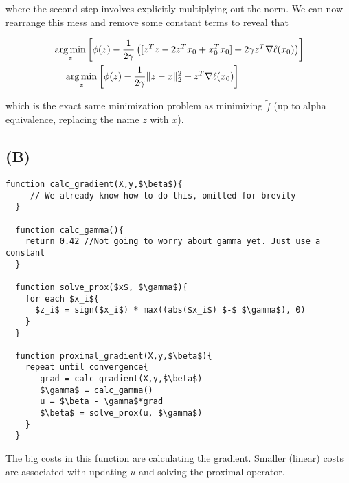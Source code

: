 \documentclass{article}
\DeclarePairedDelimiter\norm{\lVert}{\rVert}
\DeclareMathOperator*{\argmin}{arg\,min}
\begin{document}
where the second step involves explicitly multiplying out the norm. We can now
rearrange this mess and remove some constant terms to reveal that

\begin{align*}
    &\argmin_z \left[ \phi(z) - \frac{1}{2\gamma} \left(  [z^Tz - 2z^Tx_0 + x_0^Tx_0]  + 2\gamma z^T \nabla \ell(x_0)
                \right)  \right]\\
    &= \argmin_z \left[ \phi(z) - \frac{1}{2\gamma} \norm{z-x}_2^2  + z^T \nabla \ell(x_0) \right]
\end{align*}

which is the exact same minimization problem as minimizing $\widetilde{f}$ (up
to alpha equivalence, replacing the name $z$ with $x$).

\subsection*{(B)}

\begin{lstlisting}[mathescape=true]
  function calc_gradient(X,y,$\beta$){
     // We already know how to do this, omitted for brevity
  }

  function calc_gamma(){
    return 0.42 //Not going to worry about gamma yet. Just use a constant
  }

  function solve_prox($x$, $\gamma$){
    for each $x_i${
      $z_i$ = sign($x_i$) * max((abs($x_i$) $-$ $\gamma$), 0)
    }
  }

  function proximal_gradient(X,y,$\beta$){
    repeat until convergence{
       grad = calc_gradient(X,y,$\beta$)
       $\gamma$ = calc_gamma()
       u = $\beta - \gamma$*grad
       $\beta$ = solve_prox(u, $\gamma$)
    }
  }
\end{lstlisting}

The big costs in this function are calculating the gradient. Smaller (linear) costs are
associated with updating $u$ and solving the proximal operator.
\end{document}
